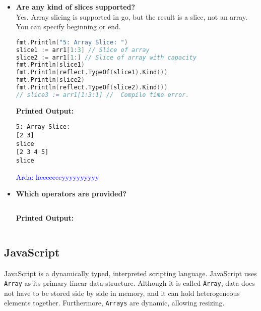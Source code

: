 \documentclass{article}
\newcommand{\arda}[1]{\textcolor{blue}{Arda: #1}}
\begin{document}
\begin{itemize}
\item \textbf{Are any kind of slices supported?} \\
Yes. Array slicing is supported in go, but the result is a slice, not an array. You can specify beginning or end.
\begin{lstlisting}[language=Go]
fmt.Println("5: Array Slice: ")
slice1 := arr1[1:3] // Slice of array
slice2 := arr1[1:] // Slice of array with capacity
fmt.Println(slice1)
fmt.Println(reflect.TypeOf(slice1).Kind())
fmt.Println(slice2)
fmt.Println(reflect.TypeOf(slice2).Kind())
// slice3 := arr1[1:3:1] //  Compile time error.
\end{lstlisting}
\textbf{Printed Output:}
\begin{verbatim}
5: Array Slice: 
[2 3]
slice
[2 3 4 5]
slice
\end{verbatim}



\arda{heeeeeeeyyyyyyyyyy}
\item \textbf{Which operators are provided?} \\
\begin{lstlisting}[language=Go]
\end{lstlisting}
\textbf{Printed Output:}
\begin{verbatim}
\end{verbatim}
\end{itemize}
\newpage





\subsection{JavaScript}
JavaScript is a dynamically typed, interpreted scripting language. JavaScript uses \texttt{Array} as its primary linear data structure. Although it is called \texttt{Array}, data does not have to be stored side by side in memory, and it can hold heterogeneous elements together. Furthermore, \texttt{Arrays} are dynamic, allowing resizing.
\end{document}
